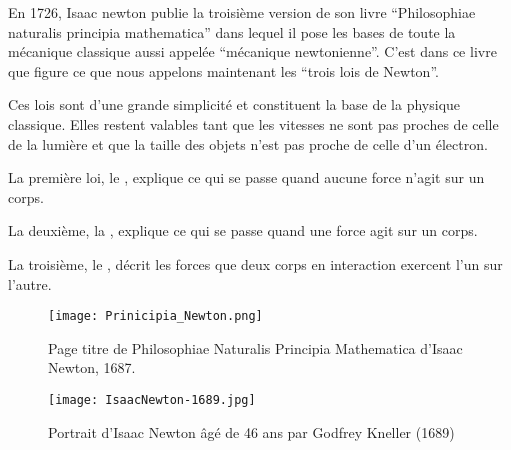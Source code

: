 En 1726, Isaac newton publie la troisième version de son livre \enquote{Philosophiae naturalis principia mathematica} dans lequel il pose les bases de toute la mécanique classique aussi appelée \enquote{mécanique newtonienne}. C'est dans ce livre que figure ce que nous appelons maintenant les \enquote{trois lois de Newton}.

Ces lois sont d'une grande simplicité et constituent la base de la physique classique. Elles restent valables tant que les vitesses ne sont pas proches de celle de la lumière et que la taille des objets n'est pas proche de celle d'un électron.

La première loi, le , explique ce qui se passe quand aucune force n'agit sur un corps.

La deuxième, la , explique ce qui se passe quand une force agit sur un corps.

La troisième, le , décrit les forces que deux corps en interaction exercent l'un sur l'autre.

\begin{figure}[!ht]
      \centering
      \begin{minipage}[t]{.47\linewidth}
            \centering
            \texttt{[image: Prinicipia\_Newton.png]}
            \caption{Page titre de Philosophiae Naturalis Principia Mathematica d'Isaac Newton, 1687.}
            \label{Prinicipia_Newton}
      \end{minipage}
      \hfill
      \begin{minipage}[t]{.47\linewidth}
            \centering
            \texttt{[image: IsaacNewton-1689.jpg]}
            \caption{Portrait d'Isaac Newton âgé de 46 ans par Godfrey Kneller (1689)}
            \label{IsaacNewton}
      \end{minipage}
\end{figure}

